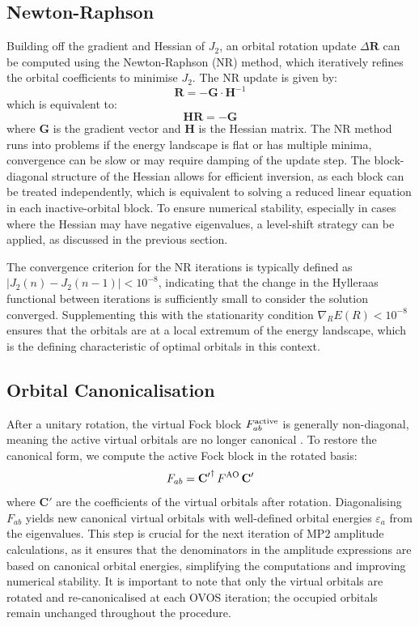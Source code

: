 \subsection{Newton-Raphson}

Building off the gradient and Hessian of $J_2$, an orbital rotation update $\Delta\mathbf{R}$ can be computed using the Newton-Raphson (NR) method, which iteratively refines the orbital coefficients to minimise $J_2$. The NR update is given by:
\begin{equation}
    \mathbf{R} = - \mathbf{G} \cdot \mathbf{H}^{-1}
\end{equation}
which is equivalent to:
\begin{equation}
    \mathbf{H} \mathbf{R} = - \mathbf{G}
\end{equation}
where $\mathbf{G}$ is the gradient vector and $\mathbf{H}$ is the Hessian matrix. The NR method runs into problems if the energy landscape is flat or has multiple minima, convergence can be slow or may require damping of the update step. The block-diagonal structure of the Hessian allows for efficient inversion, as each block can be treated independently, which is equivalent to solving a reduced linear equation in each inactive-orbital block. To ensure numerical stability, especially in cases where the Hessian may have negative eigenvalues, a level-shift strategy can be applied, as discussed in the previous section. 

The convergence criterion for the NR iterations is typically defined as $|J_2{(n)} - J_2{(n-1)}| < 10^{-8}$, indicating that the change in the Hylleraas functional between iterations is sufficiently small to consider the solution converged. Supplementing this with the stationarity condition $\nabla_R E(R) < 10^{-8}$ ensures that the orbitals are at a local extremum of the energy landscape, which is the defining characteristic of optimal orbitals in this context.  




\subsection{Orbital Canonicalisation}

After a unitary rotation, the virtual Fock block $F_{ab}^{\rm active}$ is generally non-diagonal, meaning the active virtual orbitals are no longer canonical \cite{Helgaker2000}. To restore the canonical form, we compute the active Fock block in the rotated basis:
\begin{equation}
    F_{ab} = \mathbf{C'}^\dagger\, F^{\rm AO}\, \mathbf{C'}
\end{equation}
where $\mathbf{C'}$ are the coefficients of the virtual orbitals after rotation. Diagonalising $F_{ab}$ yields new canonical virtual orbitals with well-defined orbital energies $\varepsilon_a$ from the eigenvalues. This step is crucial for the next iteration of MP2 amplitude calculations, as it ensures that the denominators in the amplitude expressions are based on canonical orbital energies, simplifying the computations and improving numerical stability. It is important to note that only the virtual orbitals are rotated and re-canonicalised at each OVOS iteration; the occupied orbitals remain unchanged throughout the procedure.

